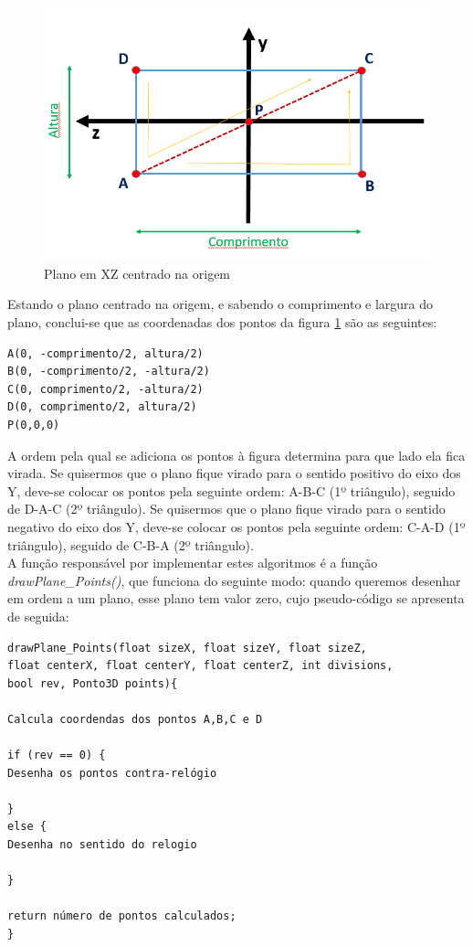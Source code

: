 \begin{figure}[htpb]
	\centering
	\includegraphics[scale=0.5]{imagens/p3_planoZ.png}
	\caption{Plano em XZ centrado na origem}
	\label{p1:fig:p3_planoZ}
\end{figure}

Estando o plano centrado na origem, e sabendo o comprimento e largura do plano, conclui-se que as coordenadas dos pontos da figura \ref{p1:fig:p3_planoZ} são as seguintes:

\begin{Verbatim}
A(0, -comprimento/2, altura/2)
B(0, -comprimento/2, -altura/2)
C(0, comprimento/2, -altura/2)
D(0, comprimento/2, altura/2)
P(0,0,0)
\end{Verbatim}


A ordem pela qual se adiciona os pontos à figura determina para que lado ela fica virada. Se quisermos que o plano fique virado para o sentido positivo do eixo dos Y, deve-se colocar os pontos pela seguinte ordem: A-B-C (1º triângulo), seguido de D-A-C (2º triângulo). Se quisermos que o plano fique virado para o sentido negativo do eixo dos Y, deve-se colocar os pontos pela seguinte ordem: C-A-D (1º triângulo), seguido de C-B-A (2º triângulo).
\\

A função responsável por implementar estes algoritmos é a função \textit{drawPlane\_Points()}, que funciona do seguinte modo: quando queremos desenhar em ordem a um plano, esse plano tem valor zero, cujo pseudo-código se apresenta de seguida:

\begin{Verbatim}
drawPlane_Points(float sizeX, float sizeY, float sizeZ, 
float centerX, float centerY, float centerZ, int divisions,
bool rev, Ponto3D points){

Calcula coordendas dos pontos A,B,C e D

if (rev == 0) {
Desenha os pontos contra-relógio

}
else {
Desenha no sentido do relogio

}

return número de pontos calculados;
}
\end{Verbatim}



